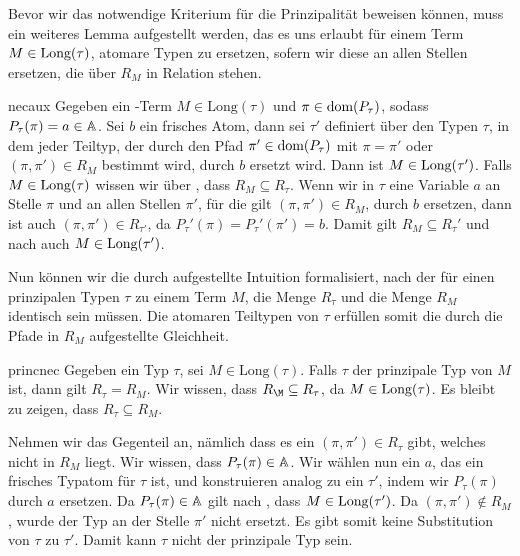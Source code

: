 Bevor wir das notwendige Kriterium für die Prinzipalität beweisen können, muss ein weiteres Lemma aufgestellt werden, das es uns erlaubt für einem Term $M\in\text{Long}(\tau)$, atomare Typen zu ersetzen, sofern wir diese an allen Stellen ersetzen, die über $R_M$ in Relation stehen.

\begin{lemma}{}{necaux}
    Gegeben ein \tlambda-Term $M\in\text{Long}(\tau)$ und $\pi\in\text{dom}(P_\tau)$, sodass $P_\tau(\pi) = a\in\mathbb{A}$. Sei $b$ ein frisches Atom, dann sei $\tau'$ definiert über den Typen $\tau$, in dem jeder Teiltyp, der durch den Pfad $\pi'\in\text{dom}(P_\tau)$ mit $\pi = \pi'$ oder $(\pi,\pi')\in R_M$ bestimmt wird, durch $b$ ersetzt wird. Dann ist $M\in\text{Long}(\tau')$.
    \Proofidea
    Falls $M\in\text{Long}(\tau)$ wissen wir über , dass $R_M\subseteq R_\tau$. Wenn wir in $\tau$ eine Variable $a$ an Stelle $\pi$ und an allen Stellen $\pi'$, für die gilt $(\pi,\pi')\in R_M$, durch $b$ ersetzen, dann ist auch $(\pi, \pi') \in R_{\tau'}$, da $P_\tau'(\pi) = P_\tau'(\pi') = b$. Damit gilt $R_M\subseteq R_{\tau}'$ und nach  auch $M\in\text{Long}(\tau')$.
\end{lemma}

Nun können wir die durch  aufgestellte Intuition formalisiert, nach der für einen prinzipalen Typen $\tau$ zu einem Term $M$, die Menge $R_\tau$ und die Menge $R_M$ identisch sein müssen. Die atomaren Teiltypen von $\tau$ erfüllen somit die durch die Pfade in $R_M$ aufgestellte Gleichheit.

\begin{lemma}{}{princnec}
    Gegeben ein Typ $\tau$, sei $M\in\text{Long}(\tau)$. Falls $\tau$ der prinzipale Typ von $M$ ist, dann gilt $R_\tau=R_M$.
    \Proofidea
    Wir wissen, dass $R_\M\subseteq R_\tau$, da $M\in\text{Long}(\tau)$. Es bleibt zu zeigen, dass $R_\tau \subseteq R_M$. 
    
    Nehmen wir das Gegenteil an, nämlich dass es ein $(\pi, \pi')\in R_\tau$ gibt, welches nicht in $R_M$ liegt. Wir wissen, dass $P_\tau(\pi) \in\mathbb{A}$. Wir wählen nun ein $a$, das ein frisches Typatom für $\tau$ ist, und konstruieren analog zu  ein $\tau'$, indem wir $P_\tau(\pi)$ durch $a$ ersetzen. Da $P_\tau(\pi)\in\mathbb{A}$ gilt nach , dass $M\in\text{Long}(\tau')$. Da $(\pi,\pi')\notin R_M$, wurde der Typ an der Stelle $\pi'$ nicht ersetzt. Es gibt somit keine Substitution von $\tau$ zu $\tau'$. Damit kann $\tau$ nicht der prinzipale Typ sein.
\end{lemma}

